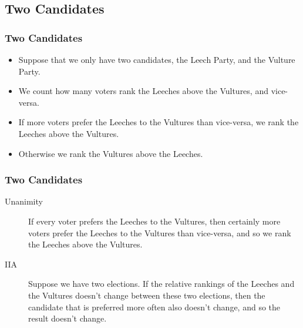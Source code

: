 \documentclass{beamer}
\begin{document}
    \subsection{Two Candidates}
    \begin{frame}
        \frametitle{Two Candidates}
    
        \begin{itemize}
            \item Suppose that we only have two candidates, the Leech Party, and the Vulture Party.
            \item We count how many voters rank the Leeches above the Vultures, and vice-versa.
            \item If more voters prefer the Leeches to the Vultures than vice-versa, we rank the Leeches above the Vultures.
            \item Otherwise we rank the Vultures above the Leeches.
        \end{itemize}
    
    \end{frame}
    \begin{frame}
        \frametitle{Two Candidates}
    
        \begin{description}
            \item[Unanimity] If every voter prefers the Leeches to the Vultures, then certainly more voters prefer the Leeches to the Vultures than vice-versa, and so we rank the Leeches above the Vultures. \pause
            \item[IIA] Suppose we have two elections. If the relative rankings of the Leeches and the Vultures doesn't change between these two elections, then the candidate that is preferred more often also doesn't change, and so the result doesn't change.
        \end{description}
    
    \end{frame}
\end{document}
